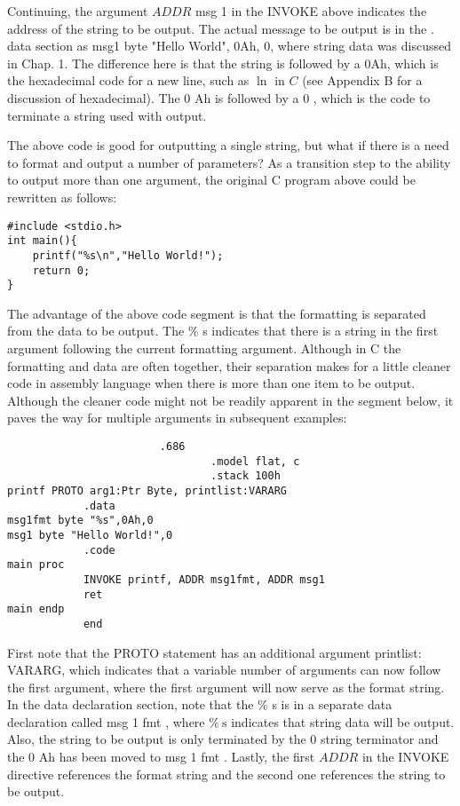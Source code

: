 \documentclass[10pt]{article}
\begin{document}
Continuing, the argument $A D D R$ msg 1 in the INVOKE above indicates the address of the string to be output. The actual message to be output is in the . data section as msg1 byte "Hello World", 0Ah, 0, where string data was discussed in Chap. 1. The difference here is that the string is followed by a 0Ah, which is the hexadecimal code for a new line, such as $\ln$ in $C$ (see Appendix B for a discussion of hexadecimal). The 0 Ah is followed by a 0 , which is the code to terminate a string used with output.

The above code is good for outputting a single string, but what if there is a need to format and output a number of parameters? As a transition step to the ability to output more than one argument, the original C program above could be rewritten as follows:

\begin{verbatim}
#include <stdio.h>
int main(){
    printf("%s\n","Hello World!");
    return 0;
}
\end{verbatim}

The advantage of the above code segment is that the formatting is separated from the data to be output. The $\%$ s indicates that there is a string in the first argument following the current formatting argument. Although in C the formatting and data are often together, their separation makes for a little cleaner code in assembly language when there is more than one item to be output. Although the cleaner code might not be readily apparent in the segment below, it paves the way for multiple arguments in subsequent examples:

\begin{verbatim}
                        .686
                                .model flat, c
                                .stack 100h
printf PROTO arg1:Ptr Byte, printlist:VARARG
            .data
msg1fmt byte "%s",0Ah,0
msg1 byte "Hello World!",0
            .code
main proc
            INVOKE printf, ADDR msg1fmt, ADDR msg1
            ret
main endp
            end
\end{verbatim}

First note that the PROTO statement has an additional argument printlist: VARARG, which indicates that a variable number of arguments can now follow the first argument, where the first argument will now serve as the format string. In the data declaration section, note that the $\%$ s is in a separate data declaration called msg 1 fmt , where $\% \mathrm{~s}$ indicates that string data will be output. Also, the string to be output is only terminated by the 0 string terminator and the 0 Ah has been moved to msg 1 fmt . Lastly, the first $A D D R$ in the INVOKE directive references the format string and the second one references the string to be output.
\end{document}
